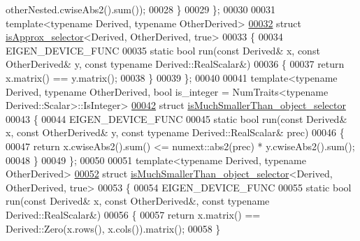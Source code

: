 \begin{DoxyCode}
       otherNested.cwiseAbs2().sum());
00028   \}
00029 \};
00030 
00031 \textcolor{keyword}{template}<\textcolor{keyword}{typename} Derived, \textcolor{keyword}{typename} OtherDerived>
\hyperlink{struct_eigen_1_1internal_1_1is_approx__selector_3_01_derived_00_01_other_derived_00_01true_01_4}{00032} \textcolor{keyword}{struct }\hyperlink{struct_eigen_1_1internal_1_1is_approx__selector}{isApprox\_selector}<Derived, OtherDerived, true>
00033 \{
00034   EIGEN\_DEVICE\_FUNC
00035   \textcolor{keyword}{static} \textcolor{keywordtype}{bool} run(\textcolor{keyword}{const} Derived& x, \textcolor{keyword}{const} OtherDerived& y, \textcolor{keyword}{const} \textcolor{keyword}{typename} Derived::RealScalar&)
00036   \{
00037     \textcolor{keywordflow}{return} x.matrix() == y.matrix();
00038   \}
00039 \};
00040 
00041 template<typename Derived, typename OtherDerived, bool is\_integer = NumTraits<typename
       Derived::Scalar>::IsInteger>
\hyperlink{struct_eigen_1_1internal_1_1is_much_smaller_than__object__selector}{00042} \textcolor{keyword}{struct }\hyperlink{struct_eigen_1_1internal_1_1is_much_smaller_than__object__selector}{isMuchSmallerThan\_object\_selector}
00043 \{
00044   EIGEN\_DEVICE\_FUNC
00045   \textcolor{keyword}{static} \textcolor{keywordtype}{bool} run(\textcolor{keyword}{const} Derived& x, \textcolor{keyword}{const} OtherDerived& y, \textcolor{keyword}{const} \textcolor{keyword}{typename} Derived::RealScalar& prec)
00046   \{
00047     \textcolor{keywordflow}{return} x.cwiseAbs2().sum() <= numext::abs2(prec) * y.cwiseAbs2().sum();
00048   \}
00049 \};
00050 
00051 \textcolor{keyword}{template}<\textcolor{keyword}{typename} Derived, \textcolor{keyword}{typename} OtherDerived>
\hyperlink{struct_eigen_1_1internal_1_1is_much_smaller_than__object__selector_3_01_derived_00_01_other_derived_00_01true_01_4}{00052} \textcolor{keyword}{struct }\hyperlink{struct_eigen_1_1internal_1_1is_much_smaller_than__object__selector}{isMuchSmallerThan\_object\_selector}<Derived, OtherDerived, true>
00053 \{
00054   EIGEN\_DEVICE\_FUNC
00055   \textcolor{keyword}{static} \textcolor{keywordtype}{bool} run(\textcolor{keyword}{const} Derived& x, \textcolor{keyword}{const} OtherDerived&, \textcolor{keyword}{const} \textcolor{keyword}{typename} Derived::RealScalar&)
00056   \{
00057     \textcolor{keywordflow}{return} x.matrix() == Derived::Zero(x.rows(), x.cols()).matrix();
00058   \}

\end{DoxyCode}
